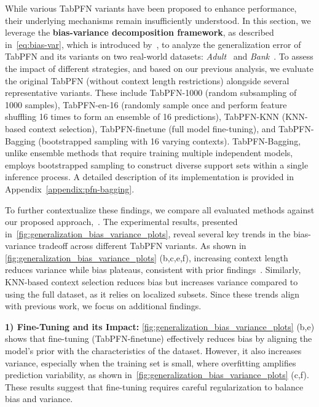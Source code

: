 While various TabPFN variants have been proposed to enhance performance, their underlying mechanisms remain insufficiently understood. In this section, we leverage the \textbf{bias-variance decomposition framework}, as described in~\autoref{eq:bias-var}, which is introduced by~\citet{SF_PFN}, to analyze the generalization error of TabPFN and its variants on two real-world datasets: \textit{Adult}~\cite{adult_2} and \textit{Bank}~\cite{bank_marketing_222}. %
To assess the impact of different strategies, and based on our previous analysis, we evaluate the original TabPFN (without context length restrictions) alongside several representative variants. These include TabPFN-1000 (random subsampling of 1000 samples), TabPFN-en-16 (randomly sample once and perform feature shuffling 16 times to form an ensemble of 16 predictions), TabPFN-KNN (KNN-based context selection), TabPFN-finetune (full model fine-tuning), and TabPFN-Bagging (bootstrapped sampling with 16 varying contexts).
TabPFN-Bagging, unlike ensemble methods that require training multiple independent models, employs bootstrapped sampling to construct diverse support sets within a single inference process. 
A detailed description of its implementation is provided in Appendix~\ref{appendix:pfn-bagging}.

To further contextualize these findings, we compare all evaluated methods against our proposed approach,~\name. The experimental results, presented in~\autoref{fig:generalization_bias_variance_plots}, reveal several key trends in the bias-variance tradeoff across different TabPFN variants.  
As shown in \autoref{fig:generalization_bias_variance_plots} (b,c,e,f), increasing context length reduces variance while bias plateaus, consistent with prior findings~\cite{SF_PFN}. Similarly,  KNN-based context selection reduces bias but increases variance compared to using the full dataset, as it relies on localized subsets. Since these trends align with previous work, we focus on additional findings.  

\textbf{1) Fine-Tuning and its Impact:}  
\autoref{fig:generalization_bias_variance_plots} (b,e) shows that fine-tuning (TabPFN-finetune) effectively reduces bias by aligning the model’s prior with the characteristics of the dataset. However, it also increases variance, especially when the training set is small, where overfitting amplifies prediction variability, as shown in~\autoref{fig:generalization_bias_variance_plots} (c,f). These results suggest that fine-tuning requires careful regularization to balance bias and variance.  

